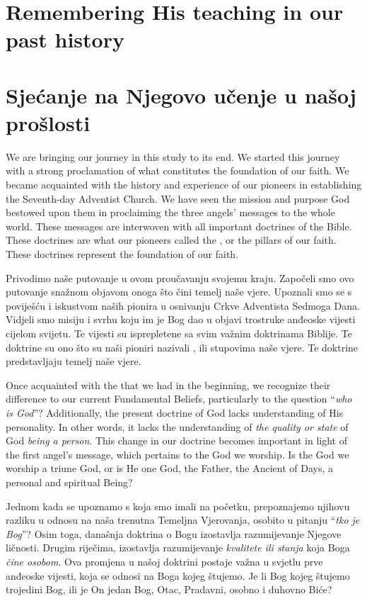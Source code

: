 \chapter{Remembering His teaching in our past history}


\chapter{Sjećanje na Njegovo učenje u našoj prošlosti}


We are bringing our journey in this study to its end. We started this journey with a strong proclamation of what constitutes the foundation of our faith. We became acquainted with the history and experience of our pioneers in establishing the Seventh-day Adventist Church. We have seen the mission and purpose God bestowed upon them in proclaiming the three angels’ messages to the whole world. These messages are interwoven with all important doctrines of the Bible. These doctrines are what our pioneers called the , or the pillars of our faith. These doctrines represent the foundation of our faith.


Privodimo naše putovanje u ovom proučavanju svojemu kraju. Započeli smo ovo putovanje snažnom objavom onoga što čini temelj naše vjere. Upoznali smo se s poviješću i iskustvom naših pionira u osnivanju Crkve Adventista Sedmoga Dana. Vidjeli smo misiju i svrhu koju im je Bog dao u objavi trostruke anđeoske vijesti cijelom svijetu. Te vijesti su isprepletene sa svim važnim doktrinama Biblije. Te doktrine su ono što su naši pioniri nazivali , ili stupovima naše vjere. Te doktrine predstavljaju temelj naše vjere.


Once acquainted with the  that we had in the beginning, we recognize their difference to our current Fundamental Beliefs, particularly to the question “\textit{who is God}”? Additionally, the present doctrine of God lacks understanding of His personality. In other words, it lacks the understanding of \textit{the quality or state} of God \textit{being a person}. This change in our doctrine becomes important in light of the first angel’s message, which pertains to the God we worship. Is the God we worship a triune God, or is He one God, the Father, the Ancient of Days, a personal and spiritual Being?


Jednom kada se upoznamo s  koja smo imali na početku, prepoznajemo njihovu razliku u odnosu na naša trenutna Temeljna Vjerovanja, osobito u pitanju “\textit{tko je Bog}”? Osim toga, današnja doktrina o Bogu izostavlja razumijevanje Njegove ličnosti. Drugim riječima, izostavlja razumijevanje \textit{kvalitete ili stanja} koja Boga \textit{čine osobom}. Ova promjena u našoj doktrini postaje važna u svjetlu prve anđeoske vijesti, koja se odnosi na Boga kojeg štujemo. Je li Bog kojeg štujemo trojedini Bog, ili je On jedan Bog, Otac, Pradavni, osobno i duhovno Biće?


